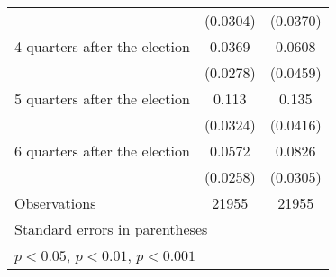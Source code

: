 \begin{table}[htbp]
\begin{tabular}{l*{2}{c}}
                    &    (0.0304)         &    (0.0370)         \\
[1em]
 4 quarters after the election&      0.0369         &      0.0608         \\
                    &    (0.0278)         &    (0.0459)         \\
[1em]
 5 quarters after the election&       0.113\sym{***}&       0.135\sym{**} \\
                    &    (0.0324)         &    (0.0416)         \\
[1em]
 6 quarters after the election&      0.0572\sym{*}  &      0.0826\sym{**} \\
                    &    (0.0258)         &    (0.0305)         \\
\hline
Observations        &       21955         &       21955         \\
\hline\hline
\multicolumn{3}{l}{\footnotesize Standard errors in parentheses}\\
\multicolumn{3}{l}{\footnotesize \sym{*} \(p<0.05\), \sym{**} \(p<0.01\), \sym{***} \(p<0.001\)}\\
\end{tabular}
\end{table}
